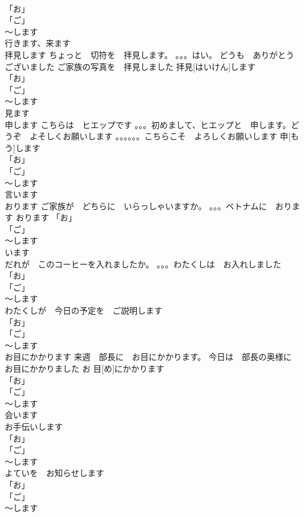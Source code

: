 \documentclass[8pt]{extreport}
\begin{document}
\begin{CJK}{UTF8}{min}
\\	「お」
\\	「ご」
\\	～します 
\\	行きます、来ます
\\	拝見します	ちょっと　切符を　拝見します。 。。。はい。 どうも　ありがとう　ございました ご家族の写真を　拝見しました	拝見[はいけん]します			
\\	「お」
\\	「ご」
\\	～します 
\\	見ます
\\	申します	こちらは　ヒエップです 。。。初めまして、ヒエップと　申します。どうぞ　よそしくお願いします 。。。。。。こちらこそ　よろしくお願いします	申[もう]します			
\\	「お」
\\	「ご」
\\	～します 
\\	言います
\\	おります	ご家族が　どちらに　いらっしゃいますか。 。。。ベトナムに　おります	おります				「お」
\\	「ご」
\\	～します 
\\	います
\\	だれが　このコーヒーを入れましたか。 。。。わたくしは　お入れしました	
\\	「お」
\\	「ご」
\\	～します 
\\	わたくしが　今日の予定を　ご説明します	
\\	「お」
\\	「ご」
\\	～します 
\\	お目にかかります	来週　部長に　お目にかかります。 今日は　部長の奥様に　お目にかかりました	お 目[め]にかかります			
\\	「お」
\\	「ご」
\\	～します 
\\	会います
\\	お手伝いします	
\\	「お」
\\	「ご」
\\	～します 
\\	よていを　お知らせします	
\\	「お」
\\	「ご」
\\	～します 

\end{CJK}
\end{document}
